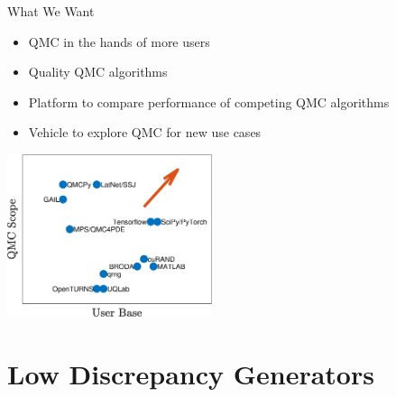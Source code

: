 \documentclass[11pt,compress,xcolor={usenames,dvipsnames},aspectratio=169]{beamer}
\begin{document}
\begin{frame}{What We Want}
\begin{multicols}{2}
	\begin{itemize}
		\item QMC in the hands of more users
		
		\item Quality QMC algorithms
		
		\item Platform to compare performance of competing QMC algorithms
		
		\item Vehicle to explore QMC for new use cases
		
	\end{itemize}
	
	\columnbreak
\includegraphics[width = 0.45\textwidth]{QMCSoftwarePlot.eps}	
\end{multicols}

\end{frame}


\section{Low Discrepancy Generators}
\end{document}

